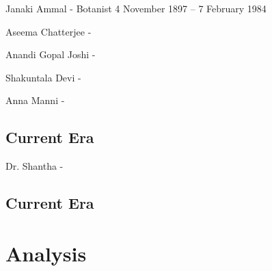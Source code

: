 \documentclass[a4paper,10pt]{article}
\begin{document}
\newblock
Janaki Ammal - Botanist 4 November 1897 – 7 February 1984 \cite{janaki}

\newblock
Aseema Chatterjee - \cite{chaterjee}

\newblock
Anandi Gopal Joshi - \cite{joshi}

\newblock
Shakuntala Devi - \cite{shakuntala}

\newblock
Anna Manni - \cite{anna}

\subsection{Current Era}
Dr. Shantha - \cite{shantha}


\subsection{Current Era}
\section{Analysis}
\end{document}

